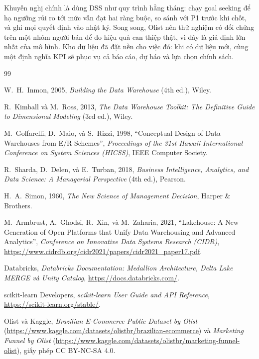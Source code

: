 \documentclass[a4paper]{article}
\begin{document}
Khuyến nghị chính là dùng DSS như quy trình hằng tháng: chạy goal seeking để hạ ngưỡng rủi ro tới mức vẫn đạt hai ràng buộc, so sánh với P1 trước khi chốt, và ghi mọi quyết định vào nhật ký. Song song, Olist nên thử nghiệm có đối chứng trên một nhóm người bán để đo hiệu quả can thiệp thật, vì đây là giả định lớn nhất của mô hình. Kho dữ liệu đã đặt nền cho việc đó: khi có dữ liệu mới, cùng một định nghĩa KPI sẽ phục vụ cả báo cáo, dự báo và lựa chọn chính sách.

\newpage
{}
{}
\begin{thebibliography}{99}

W.~H.~Inmon, 2005, \textit{Building the Data Warehouse} (4th ed.), Wiley.

R.~Kimball và M.~Ross, 2013, \textit{The Data Warehouse Toolkit: The Definitive Guide to Dimensional Modeling} (3rd ed.), Wiley.

M.~Golfarelli, D.~Maio, và S.~Rizzi, 1998, ``Conceptual Design of Data Warehouses from E/R Schemes'', \textit{Proceedings of the 31st Hawaii International Conference on System Sciences (HICSS)}, IEEE Computer Society.

R.~Sharda, D.~Delen, và E.~Turban, 2018, \textit{Business Intelligence, Analytics, and Data Science: A Managerial Perspective} (4th ed.), Pearson.

H.~A.~Simon, 1960, \textit{The New Science of Management Decision}, Harper \& Brothers.

M.~Armbrust, A.~Ghodsi, R.~Xin, và M.~Zaharia, 2021, ``Lakehouse: A New Generation of Open Platforms that Unify Data Warehousing and Advanced Analytics'', \textit{Conference on Innovative Data Systems Research (CIDR)}, \url{https://www.cidrdb.org/cidr2021/papers/cidr2021_paper17.pdf}.

Databricks, \textit{Databricks Documentation: Medallion Architecture, Delta Lake MERGE và Unity Catalog}, \url{https://docs.databricks.com/}.

scikit-learn Developers, \textit{scikit-learn User Guide and API Reference}, \url{https://scikit-learn.org/stable/}.

Olist và Kaggle, \textit{Brazilian E-Commerce Public Dataset by Olist} (\url{https://www.kaggle.com/datasets/olistbr/brazilian-ecommerce}) và \textit{Marketing Funnel by Olist} (\url{https://www.kaggle.com/datasets/olistbr/marketing-funnel-olist}), giấy phép CC BY-NC-SA 4.0.


\end{thebibliography}
\end{document}
